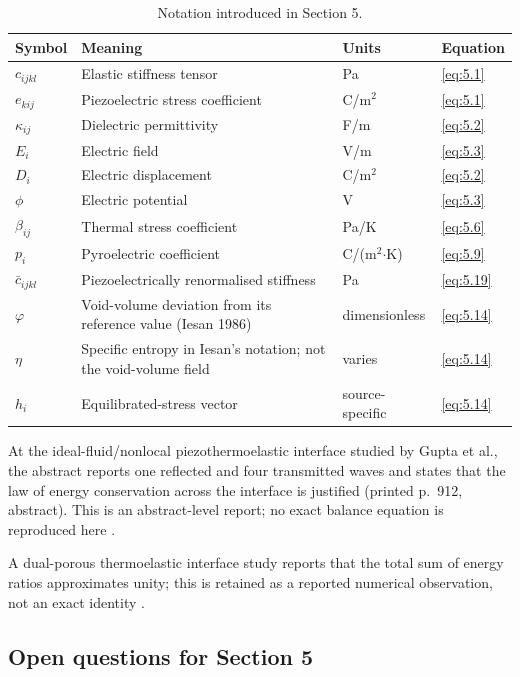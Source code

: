 \begin{table}[htbp]
\centering
\small
\caption{Notation introduced in Section 5.}
\label{tab:notation-sec5}
\begin{tabularx}{\textwidth}{@{}p{1.8cm}X p{2.2cm}p{2.1cm}@{}}
\toprule
\textbf{Symbol} & \textbf{Meaning} & \textbf{Units} & \textbf{Equation} \\
\midrule
$c_{ijkl}$ & Elastic stiffness tensor & Pa & \eqref{eq:5.1} \\
$e_{kij}$ & Piezoelectric stress coefficient & C/m$^2$ & \eqref{eq:5.1} \\
$\kappa_{ij}$ & Dielectric permittivity & F/m & \eqref{eq:5.2} \\
$E_i$ & Electric field & V/m & \eqref{eq:5.3} \\
$D_i$ & Electric displacement & C/m$^2$ & \eqref{eq:5.2} \\
$\phi$ & Electric potential & V & \eqref{eq:5.3} \\
$\beta_{ij}$ & Thermal stress coefficient & Pa/K & \eqref{eq:5.6} \\
$p_i$ & Pyroelectric coefficient & C/(m$^2$$\cdot$K) & \eqref{eq:5.9} \\
$\bar{c}_{ijkl}$ & Piezoelectrically renormalised stiffness & Pa & \eqref{eq:5.19} \\
$\varphi$ & Void-volume deviation from its reference value (Iesan 1986) & dimensionless & \eqref{eq:5.14} \\
$\eta$ & Specific entropy in Iesan's notation; not the void-volume field & varies & \eqref{eq:5.14} \\
$h_i$ & Equilibrated-stress vector & source-specific & \eqref{eq:5.14} \\
\bottomrule
\end{tabularx}
\end{table}

At the ideal-fluid/nonlocal piezothermoelastic interface studied by Gupta et al., the abstract reports one reflected and four transmitted waves and states that the law of energy conservation across the interface is justified (printed p.~912, abstract). This is an abstract-level report; no exact balance equation is reproduced here \cite{Gupta2023IJNMF}.

A dual-porous thermoelastic interface study reports that the total sum of energy ratios approximates unity; this is retained as a reported numerical observation, not an exact identity \cite{Kumar2023PhysScr}.

\subsection{Open questions for Section 5}

